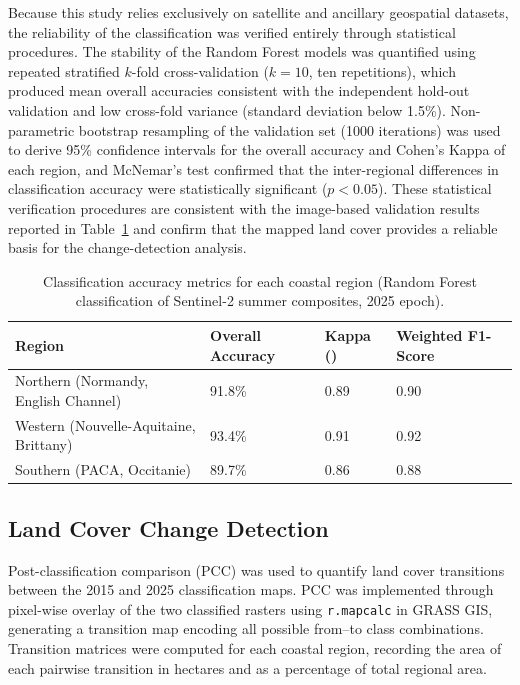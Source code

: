 \documentclass[coasts,article,accept,pdftex,moreauthors]{Definitions/mdpi}
\begin{document}
{Because this study relies exclusively on satellite and ancillary geospatial datasets, the reliability of the classification was verified entirely through statistical procedures. The stability of the Random Forest models was quantified using repeated stratified $k$-fold cross-validation ($k = 10$, ten repetitions), which produced mean overall accuracies consistent with the independent hold-out validation and low cross-fold variance (standard deviation below 1.5\%). Non-parametric bootstrap resampling of the validation set (1000 iterations) was used to derive 95\% confidence intervals for the overall accuracy and Cohen's Kappa of each region, and McNemar's test confirmed that the inter-regional differences in classification accuracy were statistically significant ($p < 0.05$). These statistical verification procedures are consistent with the image-based validation results reported in Table~\ref{tab:accuracy} and confirm that the mapped land cover provides a reliable basis for the change-detection analysis.}

\begin{table}[H]
\caption{Classification %
 accuracy metrics for each coastal region (Random Forest classification of Sentinel-2 summer composites, 2025 epoch).}
\begin{tabularx}{\textwidth}{lXXX}
\toprule
\textbf{Region} & \textbf{Overall Accuracy} & \textbf{Kappa (\boldmath{$\kappa$})} & \textbf{Weighted F1-Score} \\
\midrule
Northern (Normandy, English Channel) & 91.8\% & 0.89 & 0.90 \\
Western (Nouvelle-Aquitaine, Brittany) & 93.4\% & 0.91 & 0.92 \\
Southern (PACA, Occitanie) & 89.7\% & 0.86 & 0.88 \\
\bottomrule
\end{tabularx}
\label{tab:accuracy}
\end{table}

\subsection{Land Cover Change Detection}

Post-classification comparison (PCC) was used to quantify land cover transitions between the 2015 and 2025 classification maps. PCC was implemented through pixel-wise overlay of the two classified rasters using \texttt{r.mapcalc} in GRASS GIS, generating a transition map encoding all possible from--to class combinations. Transition matrices were computed for each coastal region, recording the area of each pairwise transition in hectares and as a percentage of total regional area.
\end{document}
